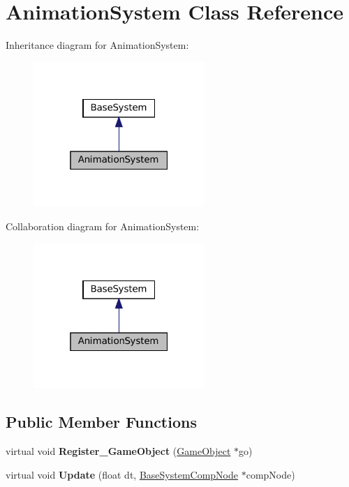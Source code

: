 \hypertarget{classAnimationSystem}{}\section{Animation\+System Class Reference}
\label{classAnimationSystem}


Inheritance diagram for Animation\+System\+:\nopagebreak
\begin{figure}[H]
\begin{center}
\leavevmode
\includegraphics[width=184pt]{classAnimationSystem__inherit__graph}
\end{center}
\end{figure}


Collaboration diagram for Animation\+System\+:\nopagebreak
\begin{figure}[H]
\begin{center}
\leavevmode
\includegraphics[width=184pt]{classAnimationSystem__coll__graph}
\end{center}
\end{figure}
\subsection*{Public Member Functions}
\begin{DoxyCompactItemize}
\item 
\mbox{\label{classAnimationSystem_a887b7a3f1fa8d9c425b6ba49e12a3ca4}} 
virtual void {\bfseries Register\+\_\+\+Game\+Object} (\hyperlink{classGameObject}{Game\+Object} $\ast$go)
\item 
\mbox{\label{classAnimationSystem_aa74600f86761b9bb47a0689665901a49}} 
virtual void {\bfseries Update} (float dt, \hyperlink{structBaseSystemCompNode}{Base\+System\+Comp\+Node} $\ast$comp\+Node)
\end{DoxyCompactItemize}
